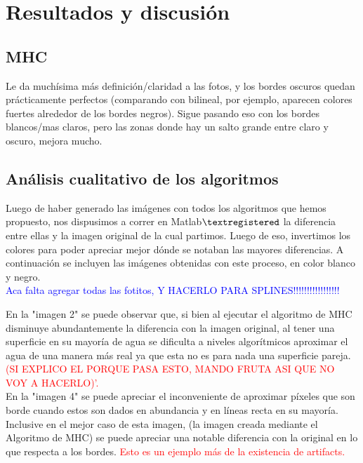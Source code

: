 \documentclass[a4paper]{article}
\begin{document}
\newpage
\section{Resultados y discusi\'on}

\newpage
\subsection{MHC}
Le da muchísima más definición/claridad a las fotos, y los bordes oscuros quedan prácticamente perfectos (comparando con bilineal, por ejemplo, aparecen colores fuertes alrededor de los bordes negros). Sigue pasando eso con los bordes blancos/mas claros, pero las zonas donde hay un salto grande entre claro y oscuro, mejora mucho.

\newpage
\subsection{An\'alisis cualitativo de los algoritmos}
Luego de haber generado las im\'agenes con todos los algoritmos que hemos propuesto, nos dispusimos a correr en Matlab$\textregistered$  la diferencia entre ellas y la imagen original de la cual partimos. Luego de eso, invertimos los colores para poder apreciar mejor d\'onde se notaban las mayores diferencias. A continuaci\'on se incluyen las im\'agenes obtenidas con este proceso, en color blanco y negro.\\

\textcolor{blue}{Aca falta agregar todas las fotitos, Y HACERLO PARA SPLINES!!!!!!!!!!!!!!!!!}


En la "imagen 2"  se puede observar que, si bien al ejecutar el algoritmo de MHC disminuye abundantemente la diferencia con la imagen original, al tener una superficie en su mayor\'ia de agua se dificulta a niveles algor\'itmicos aproximar el agua de una manera m\'as real ya que esta no es para nada una superficie pareja. \textcolor{red}{(SI EXPLICO EL PORQUE PASA ESTO, MANDO FRUTA ASI QUE NO VOY A HACERLO)'.}\\

En la "imagen 4" se puede apreciar el inconveniente de aproximar p\'ixeles que son borde cuando estos son dados en abundancia y en l\'ineas recta en su mayor\'ia. Inclusive en el mejor caso de esta imagen, (la imagen creada mediante el Algoritmo de MHC) se puede apreciar una notable diferencia con la original en lo que respecta a los bordes. \textcolor{red}{Esto es un ejemplo m\'as de la existencia de artifacts.}\\
\end{document}
